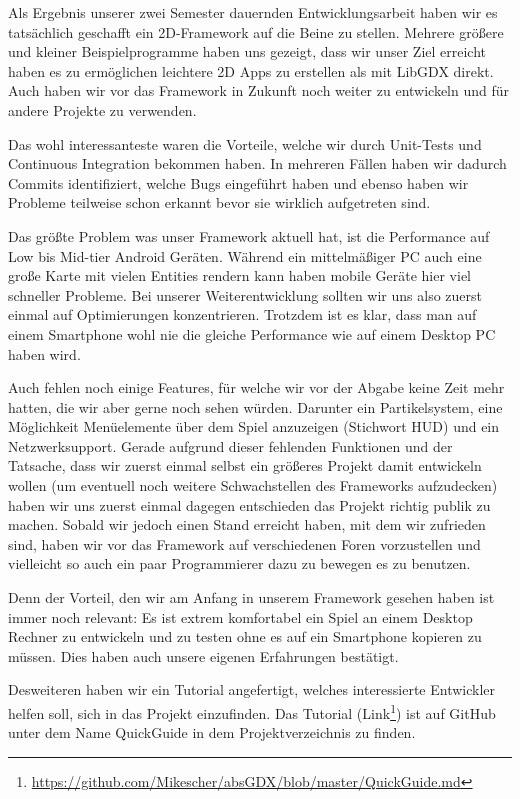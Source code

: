 Als Ergebnis unserer zwei Semester dauernden Entwicklungsarbeit haben wir es tatsächlich geschafft ein 2D-Framework auf die Beine zu stellen.
Mehrere größere und kleiner Beispielprogramme haben uns gezeigt, dass wir unser Ziel erreicht haben es zu ermöglichen leichtere 2D Apps zu erstellen als mit LibGDX direkt.
Auch haben wir vor das Framework in Zukunft noch weiter zu entwickeln und für andere Projekte zu verwenden.

Das wohl interessanteste waren die Vorteile, welche wir durch Unit-Tests und Continuous Integration bekommen haben. In mehreren Fällen haben wir dadurch Commits identifiziert, welche Bugs eingeführt haben und ebenso haben wir Probleme teilweise schon erkannt bevor sie wirklich aufgetreten sind.

Das größte Problem was unser Framework aktuell hat, ist die Performance auf Low bis Mid-tier Android Geräten. Während ein mittelmäßiger PC auch eine große Karte mit vielen Entities rendern kann haben mobile Geräte hier viel schneller Probleme. Bei unserer Weiterentwicklung sollten wir uns also zuerst einmal auf Optimierungen konzentrieren. Trotzdem ist es klar, dass man auf einem Smartphone wohl nie die gleiche Performance wie auf einem Desktop PC haben wird.

Auch fehlen noch einige Features, für welche wir vor der Abgabe keine Zeit mehr hatten, die wir aber gerne noch sehen würden. Darunter ein Partikelsystem, eine Möglichkeit Menüelemente über dem Spiel anzuzeigen (Stichwort HUD) und ein Netzwerksupport. Gerade aufgrund dieser fehlenden Funktionen und der Tatsache, dass wir zuerst einmal selbst ein größeres Projekt damit entwickeln wollen (um eventuell noch weitere Schwachstellen des Frameworks aufzudecken) haben wir uns zuerst einmal dagegen entschieden das Projekt richtig publik zu machen. 
Sobald wir jedoch einen Stand erreicht haben, mit dem wir zufrieden sind, haben wir vor das Framework auf verschiedenen Foren vorzustellen und vielleicht so auch ein paar Programmierer dazu zu bewegen es zu benutzen.

Denn der Vorteil, den wir am Anfang in unserem Framework gesehen haben ist immer noch relevant: Es ist extrem komfortabel ein Spiel an einem Desktop Rechner zu entwickeln und zu testen ohne es auf ein Smartphone kopieren zu müssen. Dies haben auch unsere eigenen Erfahrungen bestätigt. 

Desweiteren haben wir ein Tutorial angefertigt, welches interessierte Entwickler helfen soll, sich in das Projekt einzufinden. Das Tutorial (Link\footnote{\url{https://github.com/Mikescher/absGDX/blob/master/QuickGuide.md}}) ist auf GitHub unter dem Name QuickGuide in dem Projektverzeichnis zu finden. 
